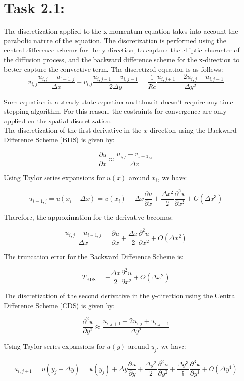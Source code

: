 \documentclass{article}
\begin{document}
\section*{\Large Task 2.1:}
The discretization applied to the x-momentum equation takes into account the parabolic nature of the equation. The discretization is performed using the central difference scheme for the y-direction, to capture the elliptic character of the diffusion process, and the backward difference scheme for the x-direction to better capture the convective term. The discretized equation is as follows:
\[
  u_{i,j}\frac{u_{i,j} - u_{i-1,j}}{\Delta x}  + v_{i,j} \frac{u_{i,j+1} - u_{i,j-1}}{2 \Delta y} = \frac{1}{Re} \frac{u_{i,j+1} - 2u_{i,j} + u_{i,j-1}}{\Delta y^2}
\]

Such equation is a steady-state equation and thus it doesn't require any time-stepping algorithm. 
For this reason, the costraints for convergence are only applied on the spatial discretization.
\\
The discretization of the first derivative in the \(x\)-direction using the Backward Difference Scheme (BDS) is given by:

\[
\frac{\partial u}{\partial x} \approx \frac{u_{i,j} - u_{i-1,j}}{\Delta x}
\]

Using Taylor series expansions for \( u(x) \) around \( x_i \), we have:

\[
u_{i-1,j} = u(x_i - \Delta x) = u(x_i) - \Delta x \frac{\partial u}{\partial x} + \frac{\Delta x^2}{2} \frac{\partial^2 u}{\partial x^2} + O(\Delta x^3)
\]

Therefore, the approximation for the derivative becomes:

\[
\frac{u_{i,j} - u_{i-1,j}}{\Delta x} = \frac{\partial u}{\partial x} + \frac{\Delta x}{2} \frac{\partial^2 u}{\partial x^2} + O(\Delta x^2)
\]

The truncation error for the Backward Difference Scheme is:

\[
T_{\text{BDS}} = -\frac{\Delta x}{2} \frac{\partial^2 u}{\partial x^2} + O(\Delta x^2)
\]

The discretization of the second derivative in the \(y\)-direction using the Central Difference Scheme (CDS) is given by:

\[
\frac{\partial^2 u}{\partial y^2} \approx \frac{u_{i,j+1} - 2u_{i,j} + u_{i,j-1}}{\Delta y^2}
\]

Using Taylor series expansions for \( u(y) \) around \( y_j \), we have:

\[
u_{i,j+1} = u(y_j + \Delta y) = u(y_j) + \Delta y \frac{\partial u}{\partial y} + \frac{\Delta y^2}{2} \frac{\partial^2 u}{\partial y^2} + \frac{\Delta y^3}{6} \frac{\partial^3 u}{\partial y^3} + O(\Delta y^4)
\]
\end{document}
